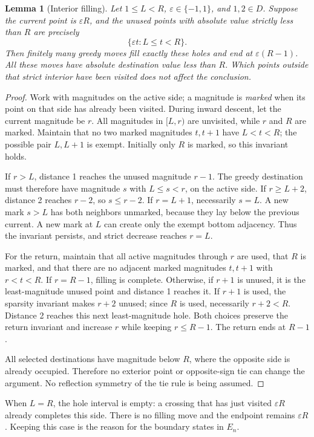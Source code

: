 \documentclass[11pt,a4paper]{article}
\newtheorem{lemma}[theorem]{Lemma}
\begin{document}
\begin{lemma}[Interior filling]\label{lem:fill}
Let $1\le L<R$, $\varepsilon\in\{-1,1\}$, and $1,2\in D$.
Suppose the current point is $\varepsilon R$, and the unused points with
absolute value strictly less than $R$ are precisely
\[
 \{\varepsilon t:L\le t<R\}.
\]
Then finitely many greedy moves fill exactly these holes and end at
$\varepsilon(R-1)$. All these moves have absolute destination value less
than $R$. Which points outside that strict interior have been visited does not affect
the conclusion.
\end{lemma}

\begin{proof}
Work with magnitudes on the active side; a magnitude is \emph{marked} when
its point on that side has already been visited. During inward descent, let the
current magnitude be $r$. All magnitudes in $[L,r)$ are unvisited, while
$r$ and $R$ are marked. Maintain that no two marked magnitudes $t,t+1$
have $L<t<R$; the possible pair $L,L+1$ is exempt. Initially only $R$ is
marked, so this invariant holds.

If $r>L$, distance 1 reaches the unused magnitude $r-1$. The greedy
destination must therefore have magnitude $s$ with $L\le s<r$, on the
active side. If $r\ge L+2$, distance 2 reaches $r-2$, so $s\le r-2$.
If $r=L+1$, necessarily $s=L$. A new mark $s>L$ has both neighbors
unmarked, because they lay below the previous current. A new mark at $L$
can create only the exempt bottom adjacency. Thus the invariant persists,
and strict decrease reaches $r=L$.

For the return, maintain that all active magnitudes through $r$ are used,
that $R$ is marked, and that there are no adjacent marked magnitudes
$t,t+1$ with $r<t<R$. If $r=R-1$, filling is complete. Otherwise, if
$r+1$ is unused, it is the least-magnitude unused point and distance 1
reaches it. If $r+1$ is used, the sparsity invariant makes $r+2$ unused;
since $R$ is used, necessarily $r+2<R$. Distance 2 reaches this next
least-magnitude hole. Both choices preserve the return invariant and
increase $r$ while keeping $r\le R-1$. The return ends at $R-1$.

All selected destinations have magnitude below $R$, where the opposite
side is already occupied. Therefore no exterior point or opposite-sign
tie can change the argument. No reflection symmetry of the tie rule is
being assumed.
\end{proof}

When $L=R$, the hole interval is empty: a crossing that has just visited
$\varepsilon R$ already completes this side. There is no filling move and
the endpoint remains $\varepsilon R$. Keeping this case is the reason for
the boundary states in $E_n$.
\end{document}
